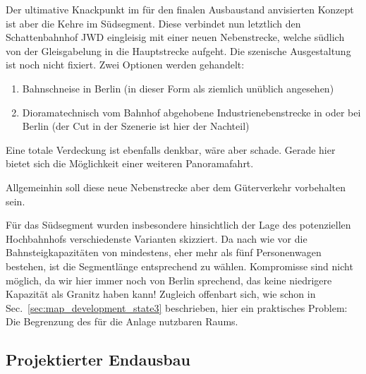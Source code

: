 Der ultimative Knackpunkt im f\"ur den finalen Ausbaustand anvisierten Konzept ist aber die Kehre im S\"udsegment.
Diese verbindet nun letztlich den Schattenbahnhof JWD eingleisig mit einer neuen Nebenstrecke, welche s\"udlich von der Gleisgabelung in die Hauptstrecke aufgeht.
Die szenische Ausgestaltung ist noch nicht fixiert.
Zwei Optionen werden gehandelt:
\begin{enumerate}
	\item Bahnschneise in Berlin (in dieser Form als ziemlich un\"ublich angesehen)
	\item Dioramatechnisch vom Bahnhof abgehobene Industrienebenstrecke in oder bei Berlin (der Cut in der Szenerie ist hier der Nachteil)
\end{enumerate}
Eine totale Verdeckung ist ebenfalls denkbar, w\"are aber schade.
Gerade hier bietet sich die M\"oglichkeit einer weiteren Panoramafahrt.

Allgemeinhin soll diese neue Nebenstrecke aber dem G\"uterverkehr vorbehalten sein.

F\"ur das S\"udsegment wurden insbesondere hinsichtlich der Lage des potenziellen Hochbahnhofs verschiedenste Varianten skizziert.
Da nach wie vor die Bahnsteigkapazit\"aten von mindestens, eher mehr als f\"unf Personenwagen bestehen, ist die Segmentl\"ange entsprechend zu w\"ahlen.
Kompromisse sind nicht m\"oglich, da wir hier immer noch von Berlin sprechend, das keine niedrigere Kapazit\"at als Granitz haben kann!
Zugleich offenbart sich, wie schon in Sec.~\ref{sec:map_development_state3} beschrieben, hier ein praktisches Problem:
Die Begrenzung des f\"ur die Anlage nutzbaren Raums.




\subsection{Projektierter Endausbau}
\label{sec:map_final_projected}

